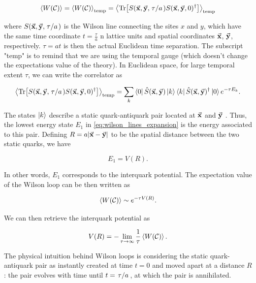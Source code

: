\documentclass[reqno,12pt]{article}
\numberwithin{equation}{section}
\begin{document}
\begin{equation}
	\expval{W(\mathcal{C})} = \expval{W(\mathcal{C})}_\text{temp} = 
	\expval{\Tr[S(\va{x}, \va{y}, \flatfrac{\tau}{a})S(\va{x}, \va{y}, 0)^\dagger]}_\text{temp}
\end{equation}

where $S(\va{x}, \va{y}, \flatfrac{\tau}{a})$ is the Wilson line connecting the sites $x$ and $y$, which have the same time
coordinate $t = \frac{\tau}{a}$ n lattice units and spatial coordinates $\va{x}$, $\va{y}$, respectively. $\tau = at$ is then
the actual Euclidean time separation. The subscript "temp" is to
remind that we are using the temporal gauge (which doesn't change the expectations value of the theory). 
In Euclidean space, for large temporal extent $\tau$, we can write the correlator as

\begin{equation} \label{eq:wilson_lines_expansion}
	\expval{\Tr[S(\va{x}, \va{y}, \flatfrac{\tau}{a})S(\va{x}, \va{y}, 0)^\dagger]}_\text{temp} = 
	\sum_k \bra{0}\hat{S}(\va{x}, \va{y})\ket{k}\bra{k}\hat{S}(\va{x}, \va{y})^\dagger\ket{0} e^{-\tau E_k}.
\end{equation}

The states $\ket{k}$ describe a static quark-antiquark pair located at $\va{x}$ and $\va{y}$ \cite{gattringer}. 
Thus, the lowest energy state $E_1$ in \eqref{eq:wilson_lines_expansion} is the energy associated to this pair. 
Defining $R = a|\va{x} - \va{y}|$ to be the spatial distance between the two static quarks, we have

\begin{equation}
	E_1 = V(R).
\end{equation}

In other words, $E_1$ corresponds to the interquark potential. The expectation value of the Wilson loop
can be then written as

\begin{equation}
	\expval{W(\mathcal{C})} \sim e^{-\tau V(R)}.
\end{equation}

We can then retrieve the interquark potential as

\begin{equation}
	V(R) = - \lim_{\tau \rightarrow \infty} \frac{1}{\tau} \expval{W(\mathcal{C})}.
\end{equation}

The physical intuition behind Wilson loops is considering the static quark-antiquark pair as instantly
created at time $t = 0$ and moved apart at a distance $R$: the pair evolves with time until $t = \flatfrac{\tau}{a}$, at which
the pair is annihilated. 
\end{document}
